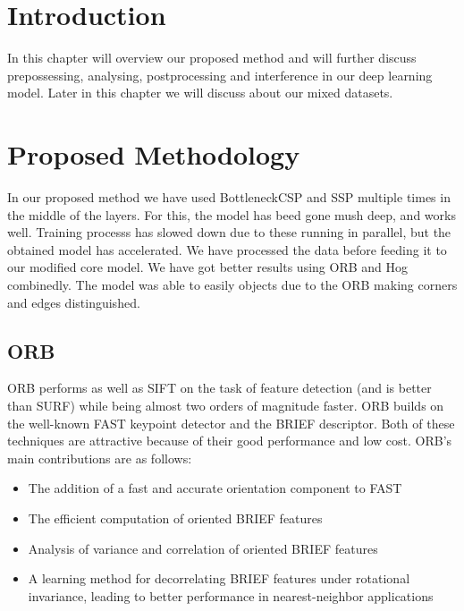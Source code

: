 \section{Introduction}

In this chapter will overview our proposed method and will further discuss prepossessing, analysing, postprocessing and interference in our deep learning model. Later in this chapter we will discuss about our mixed datasets.

\section{Proposed Methodology}

In our proposed method we have used BottleneckCSP and SSP multiple times in the middle of the layers. For this, the model has beed gone mush deep, and works well. Training processs has slowed down due to these running in parallel, but the obtained model has accelerated. We have processed the data before feeding it to our modified core model. We have got better results using ORB and Hog combinedly. The model was able to easily objects due to the ORB making corners and edges distinguished. 





\subsection{ORB}
ORB performs as well as SIFT on the task of feature detection (and is better than SURF) while being almost two orders of magnitude faster. ORB builds on the well-known FAST keypoint detector and the BRIEF descriptor. Both of these techniques are attractive because of their good performance and low cost. ORB’s main contributions are as follows:

\begin{itemize}
    \item The addition of a fast and accurate orientation component to FAST
    \item The efficient computation of oriented BRIEF features
    \item Analysis of variance and correlation of oriented BRIEF features
    \item A learning method for decorrelating BRIEF features under rotational invariance, leading to better performance in nearest-neighbor applications
\end{itemize}


